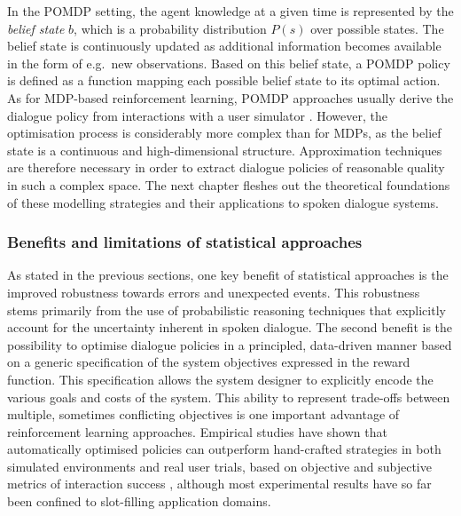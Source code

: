 In the POMDP setting, the agent knowledge at a given time is represented by the \textit{belief state} $b$, which is a probability distribution $P(s)$ over possible states.  The belief state is continuously updated as additional information becomes available in the form of e.g.\ new observations. Based on this belief state, a POMDP policy is defined as a function mapping each possible belief state to its optimal action.  As for MDP-based reinforcement learning, POMDP approaches usually derive the dialogue policy from interactions with a user simulator  \citep{Young:2010,Thomson:2010:BUD:1772996.1773040, daubigney2012}. However, the optimisation process is considerably more complex than for MDPs, as the belief state is a continuous and high-dimensional structure. Approximation techniques are therefore necessary in order to extract dialogue policies of reasonable quality in such a complex space. The next chapter fleshes out the theoretical foundations of these modelling strategies and their applications to spoken dialogue systems.

\subsubsection*{Benefits and limitations of statistical approaches}


As stated in the previous sections, one key benefit of statistical approaches is the improved robustness towards errors and unexpected events. This robustness stems primarily from the use of probabilistic reasoning techniques that explicitly account for the uncertainty inherent in spoken dialogue.  The second benefit is the possibility to optimise dialogue policies in a principled, data-driven manner based on a generic specification of the system objectives expressed in the reward function.  This specification allows the system designer to explicitly encode the various goals and costs of the system. This ability to represent trade-offs between multiple, sometimes conflicting objectives is one important advantage of reinforcement learning approaches.  Empirical studies have shown that automatically optimised policies can outperform hand-crafted strategies in both simulated environments and real user trials, based on objective and subjective metrics of interaction success \citep{Supelec270,6407655}, although most experimental results have so far been confined to slot-filling application domains. 

